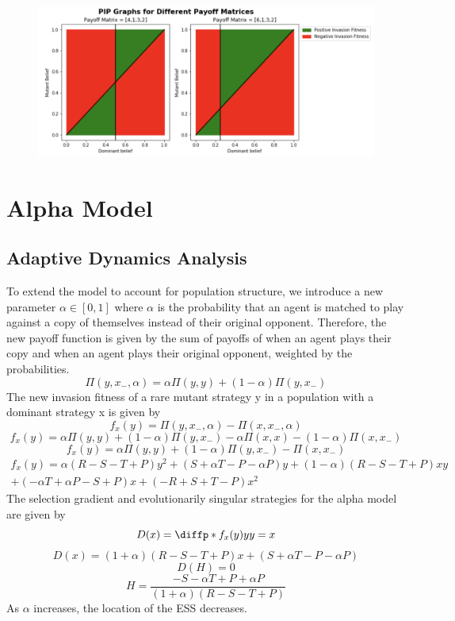 \documentclass[]{llncs}
\begin{document}
\begin{figure}
\centering
\includegraphics[width=15cm]{images/pip_basic}
\caption{ }
\end{figure}


\section{Alpha Model}

\subsection{Adaptive Dynamics Analysis}

To extend the model to account for population structure, we introduce a new parameter $\alpha \in [0, 1]$ where $\alpha$ is the probability that an agent is matched to play against a copy of themselves instead of their original opponent. Therefore, the new payoff function is given by the sum of payoffs of when an agent plays their copy and when an agent plays their original opponent, weighted by the probabilities.
\[ 
\Pi ( y, x_{-}, \alpha ) = \alpha \Pi ( y, y) + (1-\alpha) \Pi ( y, x_{-} )
\]
The new invasion fitness of a rare mutant strategy y in a population with a dominant strategy x is given by 
\[
f_x(y) = \Pi ( y, x_{-}, \alpha ) - \Pi ( x, x_{-}, \alpha )
\]
\[
f_x(y) = \alpha \Pi ( y, y) + (1-\alpha) \Pi ( y, x_{-} ) - \alpha \Pi ( x, x) - (1-\alpha) \Pi ( x,  x_{-} )
\]
\[
f_x(y) = \alpha \Pi ( y, y) + (1-\alpha) \Pi ( y, x_{-} ) - \Pi ( x,  x_{-} )
\]
\begin{multline}
f_x(y) = \alpha (R-S-T+P) y^2 +(S + \alpha T - P - \alpha P) y + (1-\alpha) (R-S-T+P) x y \\+ (-\alpha T + \alpha P - S + P) x + (-R+S+T-P) x^2
\end{multline}
The selection gradient and evolutionarily singular strategies for the alpha model are given by 
\[
D(x) = \diffp*{f_x(y)}{y}{y=x}
\]
\[
D(x) = (1+\alpha) (R-S-T+P) x + (S + \alpha T - P - \alpha P) 
\]
\[
D(H) = 0
\]
\[
H = \frac{-S - \alpha T + P + \alpha P}{(1+\alpha)(R-S-T+P)}
\]
As $\alpha$ increases, the location of the ESS decreases. 
\end{document}
